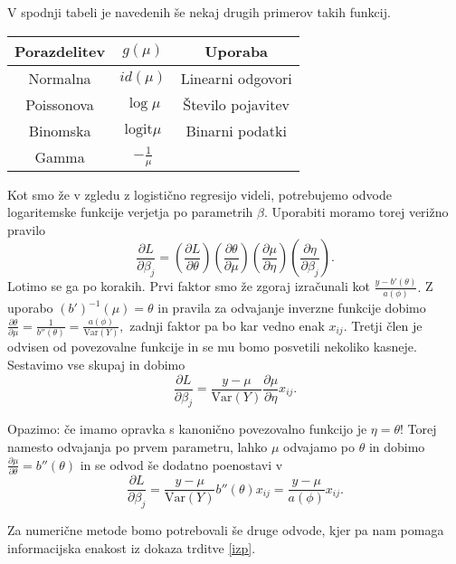 \documentclass[12pt,a4paper]{amsart}
\theoremstyle{definition} %
\theoremstyle{plain} %
\begin{document}
V spodnji tabeli je navedenih še nekaj drugih primerov takih funkcij.

\begin{center}
    \begin{tabular}{ | c | c | c |}
        \hline
        Porazdelitev & $g(\mu)$ & Uporaba \\
        \hline
        Normalna & $id(\mu)$ &  Linearni odgovori\\
        Poissonova & $\log \mu$ & Število pojavitev \\
        Binomska & $\mathrm{logit}\mu$ & Binarni podatki\\
        Gamma & $-\frac{1}{\mu}$ & \\
        \hline
    \end{tabular}
\end{center}

Kot smo že v zgledu z logistično regresijo videli, potrebujemo odvode logaritemske funkcije verjetja po parametrih $\beta.$ Uporabiti moramo torej verižno pravilo 
\[
    \frac{\partial L}{\partial\beta_{j}} = \left(\frac{\partial L}{\partial \theta}\right)\left(\frac{\partial \theta}{\partial\mu}\right)
    \left(\frac{\partial\mu}{\partial\eta}\right)\left(\frac{\partial\eta}{\partial\beta_{j}}\right).
\]
Lotimo se ga po korakih. Prvi faktor smo že zgoraj izračunali kot $\frac{y-b'(\theta)}{a(\phi)}.$ Z uporabo $(b')^{-1}(\mu) = \theta$ in pravila za odvajanje inverzne funkcije 
dobimo $\frac{\partial \theta}{\partial\mu} = \frac{1}{b''(\theta)} = \frac{a(\phi)}{\mathrm{Var}(Y)},$ zadnji faktor pa bo kar vedno enak $x_{ij}.$ Tretji člen je odvisen
od povezovalne funkcije in se mu bomo posvetili nekoliko kasneje. Sestavimo vse skupaj in dobimo
\[
    \frac{\partial L}{\partial\beta_{j}} = \frac{y-\mu}{\mathrm{Var}(Y)}\frac{\partial \mu}{\partial\eta}x_{ij}.
\]

Opazimo: če imamo opravka s kanonično povezovalno funkcijo je $\eta = \theta!$ Torej namesto odvajanja po prvem parametru, lahko $\mu$ odvajamo po $\theta$ in
dobimo $\frac{\partial\mu}{\partial\theta} = b''(\theta)$ in se odvod še dodatno poenostavi v
\begin{equation}
    \frac{\partial L}{\partial\beta_{j}} = \frac{y-\mu}{\mathrm{Var}(Y)}b''(\theta)x_{ij} = \frac{y-\mu}{a(\phi)}x_{ij}.
\end{equation}

Za numerične metode bomo potrebovali še druge odvode, kjer pa nam pomaga informacijska enakost iz dokaza trditve \ref{izp}.
\end{document}
